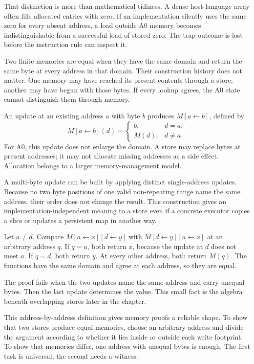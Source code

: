 That distinction is more than mathematical tidiness. A dense host-language
array often fills allocated entries with zero. If an implementation silently
uses the same zero for every absent address, a load outside A0 memory becomes
indistinguishable from a successful load of stored zero. The trap outcome is
lost before the instruction rule can inspect it.

Two finite memories are equal when they have the same domain and return the
same byte at every address in that domain. Their construction history does not
matter. One memory may have reached its present contents through a store;
another may have begun with those bytes. If every lookup agrees, the A0 state
cannot distinguish them through memory.

An update at an existing address \(a\) with byte \(b\) produces
\(M[a\leftarrow b]\), defined by
\[
 M[a\leftarrow b](d)=
 \left\{\begin{array}{ll}
 b, & d=a,\\
 M(d), & d\neq a.
 \end{array}\right.
\]
For A0, this update does not enlarge the domain. A store may replace bytes at
present addresses; it may not allocate missing addresses as a side effect.
Allocation belongs to a larger memory-management model.

A multi-byte update can be built by applying distinct single-address updates.
Because no two byte positions of one valid non-repeating range name the same
address, their order does not change the result. This construction gives an
implementation-independent meaning to a store even if a concrete executor
copies a slice or updates a persistent map in another way.

\begin{proofkit}[title={Distinct single-byte updates commute}]
Let \(a\neq d\). Compare \(M[a\leftarrow x][d\leftarrow y]\) with
\(M[d\leftarrow y][a\leftarrow x]\) at an arbitrary address \(q\). If
\(q=a\), both return \(x\), because the update at \(d\) does not meet \(a\).
If \(q=d\), both return \(y\). At every other address, both return \(M(q)\).
The functions have the same domain and agree at each address, so they are
equal.
\end{proofkit}

The proof fails when the two updates name the same address and carry unequal
bytes. Then the last update determines the value. This small fact is the
algebra beneath overlapping stores later in the chapter.

This address-by-address definition gives memory proofs a reliable shape. To show that
two stores produce equal memories, choose an arbitrary address and divide the
argument according to whether it lies inside or outside each write footprint.
To show that memories differ, one address with unequal bytes is enough. The
first task is universal; the second needs a witness.

